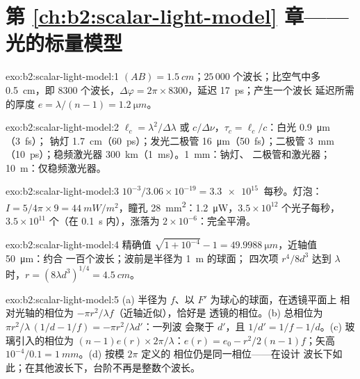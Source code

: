 \section*{第 \ref{ch:b2:scalar-light-model} 章——光的标量模型}

\begin{solution}{exo:b2:scalar-light-model:1}
$(AB) = \qty{1.5}{cm}$；$25\,000$ 个波长；比空气中多 \qty{0.5}{cm}，即 $8300$
个波长，$\Delta\varphi = 2\pi \times 8300$，延迟 \qty{17}{ps}；产生一个波长
延迟所需的厚度 $e = \lambda/(n - 1) = \qty{1.2}{\micro m}$。
\end{solution}

\begin{solution}{exo:b2:scalar-light-model:2}
$\ell_c = \lambda^2/\Delta\lambda$ 或 $c/\Delta\nu$，$\tau_c = \ell_c/c$：白光 \qty{0.9}{\micro m}（\qty{3}{fs}）；
钠灯 \qty{1.7}{cm}（\qty{60}{ps}）；发光二极管 \qty{16}{\micro m}（\qty{50}{fs}）；二极管 \qty{3}{mm}
（\qty{10}{ps}）；稳频激光器 \qty{300}{km}（\qty{1}{ms}）。\qty{1}{mm}：钠灯、
二极管和激光器；\qty{10}{m}：仅稳频激光器。
\end{solution}

\begin{solution}{exo:b2:scalar-light-model:3}
$10^{-3}/3.06 \times 10^{-19} = \qty{3.3e15}{}$ 每秒。灯泡：$I = 5/4\pi \times 9 =
\qty{44}{mW/m^2}$，瞳孔 \qty{28}{mm^2}：\qty{1.2}{\micro W}，$3.5 \times 10^{12}$ 个光子每秒，
$3.5 \times 10^{11}$ 个（在 \qty{0.1}{s} 内），涨落为 $2 \times 10^{-6}$：完全平滑。
\end{solution}

\begin{solution}{exo:b2:scalar-light-model:4}
精确值 $\sqrt{1 + 10^{-4}} - 1 = \qty{49.9988}{\micro m}$，近轴值 \qty{50}{\micro m}：约合
一百个波长；波前是半径为 \qty{1}{m} 的球面；
四次项 $r^4/8d^3$ 达到 $\lambda$ 时，$r = (8\lambda d^3)^{1/4} = \qty{4.5}{cm}$。
\end{solution}

\begin{solution}{exo:b2:scalar-light-model:5}
(a) 半径为 $f$、以 $F'$ 为球心的球面，在透镜平面上
相对光轴的相位为 $-\pi r^2/\lambda f$（近轴近似），恰好是
透镜的相位。(b) 总相位为 $\pi r^2/\lambda\,(1/d - 1/f) = -\pi r^2/\lambda d'$：一列波
会聚于 $d'$，且 $1/d' = 1/f - 1/d$。(c) 玻璃引入的相位为 $(n - 1)e(r)
\times2\pi/\lambda$：$e(r) = e_0 - r^2/2(n - 1)f$；矢高 $10^{-4}/0.1 = \qty{1}{mm}$。(d) 按模 $2\pi$ 定义的
相位仍是同一相位——在设计
波长下如此；在其他波长下，台阶不再是整数个波长。
\end{solution}

